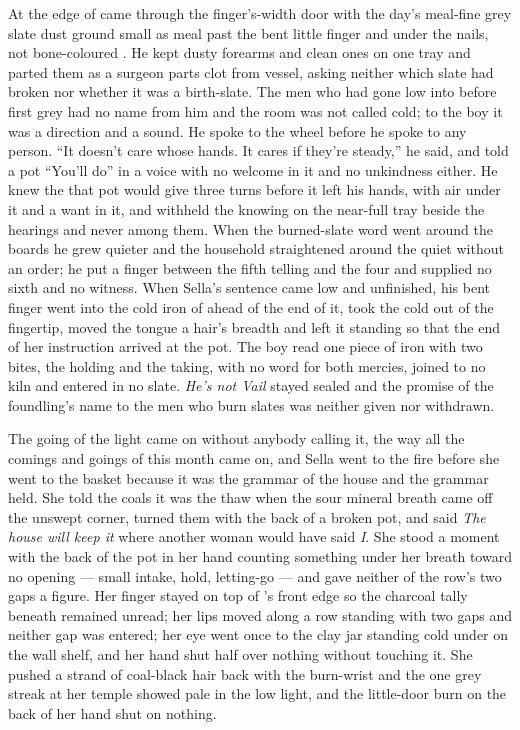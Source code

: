 At the edge of   came through the finger's-width door with the day's meal-fine grey slate dust ground small as meal past the bent little finger and under the nails, not bone-coloured . He kept dusty forearms and clean ones on one tray and parted them as a surgeon parts clot from vessel, asking neither which slate had broken nor whether it was a birth-slate. The men who had gone low into  before first grey had no name from him and the room was not called cold; to the boy it was a direction and a sound. He spoke to the wheel before he spoke to any person. “It doesn't care whose hands. It cares if they're steady,” he said, and told a pot “You'll do” in a voice with no welcome in it and no unkindness either. He knew the  that pot would give three turns before it left his hands, with air under it and a want in it, and withheld the knowing on the near-full tray beside the hearings and never among them. When the burned-slate word went around the boards he grew quieter and the household straightened around the quiet without an order; he put a finger between the fifth telling and the four and supplied no sixth and no witness. When Sella's sentence came low and unfinished, his bent finger went into the cold iron of  ahead of the end of it, took the cold out of the fingertip, moved the tongue a hair's breadth and left it standing so that the end of her instruction arrived at the pot. The boy read one piece of iron with two bites, the holding and the taking, with no  word for both mercies, joined to no kiln and entered in no slate. \emph{He's not Vail} stayed sealed and the promise of the foundling's name to the men who burn slates was neither given nor withdrawn.

The going of the light came on without anybody calling it, the way all the comings and goings of this month came on, and Sella went to the fire before she went to the basket because it was the grammar of the house and the grammar held. She told the coals it was the thaw when the sour mineral breath came off the unswept corner, turned them with the back of a broken pot, and said \emph{The house will keep it} where another woman would have said \emph{I}. She stood a moment with the back of the pot in her hand counting something under her breath toward no opening --- small intake, hold, letting-go --- and gave neither of the row's two gaps a figure. Her finger stayed on top of 's front edge so the charcoal tally beneath remained unread; her lips moved along a row standing with two gaps and neither gap was entered; her eye went once to the clay jar standing cold under  on the wall shelf, and her hand shut half over nothing without touching it. She pushed a strand of coal-black hair back with the burn-wrist and the one grey streak at her temple showed pale in the low light, and the little-door burn on the back of her hand shut on nothing.

